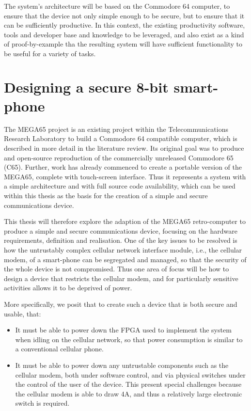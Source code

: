 The system’s architecture will be based on the Commodore 64 computer, to ensure that the device not only simple enough to be secure, but to ensure that it can be sufficiently productive. In this context, the existing productivity software, tools and developer base and knowledge to be leveraged, and also exist as a kind of proof-by-example tha the resulting system will have sufficient functionality to be useful for a variety of tasks.


\section{Designing a secure 8-bit smart-phone}
  
The MEGA65 project is an existing project within the Telecommunications Research Laboratory to build a Commodore 64 compatible computer, which is described in more detail in the literature review.
Its original goal was to produce and open-source reproduction of the commercially unreleased Commodore 65 (C65).
Further, work has already commenced to create a portable version of the MEGA65, complete with touch-screen interface.
Thus it represents a system with a simple architecture and with full source code availability, which can be used within this thesis as the basis for the creation of a simple and secure communications device.

This thesis will therefore explore the adaption of the MEGA65 retro-computer to produce a simple and secure communications device, focusing
on the hardware requirements, definition and realisation.
One of the key issues to be resolved is how the untrustably complex cellular network interface module, i.e., the cellular modem, of a smart-phone can be segregated and managed, so that the security of the whole device is not compromised.
Thus one area of focus will be how to design a device that restricts the cellular modem, and for particularly sensitive activities allows it to be deprived of power.

More specifically, we posit that to create such a device that is both secure and usable, that:
\begin{itemize}
	\item It must be able to power down the FPGA used to implement the system when idling on the cellular network, so that power consumption is similar to a conventional cellular phone.\\
	\item It must be able to power down any untrustable components such as the cellular modem, both under software control, and via physical switches under the control of the user of the device. This present special challenges because the cellular modem is able to draw 4A, and thus a relatively large electronic switch is required.\\
\end{itemize}

